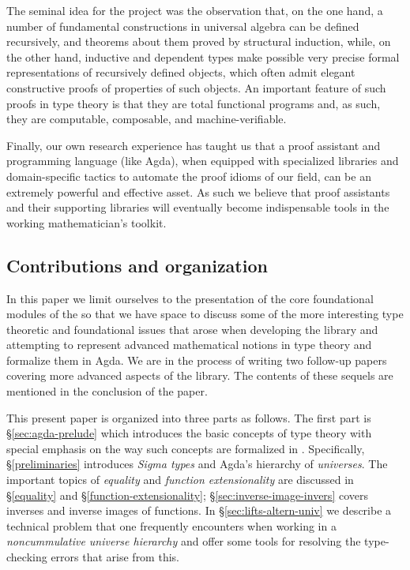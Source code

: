 The seminal idea for the \agdaualib project was the observation that, on the one hand, a number of fundamental constructions in universal algebra can be defined recursively, and theorems about them proved by structural induction, while, on the other hand, inductive and dependent types make possible very precise formal representations of recursively defined objects, which often admit elegant constructive proofs of properties of such objects.  An important feature of such proofs in type theory is that they are total functional programs and, as such, they are computable, composable, and machine-verifiable.

Finally, our own research experience has taught us that a proof assistant and programming language (like Agda), when equipped with specialized libraries and domain-specific tactics to automate the proof idioms of our field, can be an extremely powerful and effective asset. As such we believe that proof assistants and their supporting libraries will eventually become indispensable tools in the working mathematician's toolkit.



\subsection{Contributions and organization}
\label{sec:contributions}

In this paper we limit ourselves to the presentation of the core foundational modules of the \ualib so that we have space to discuss some of the more interesting type theoretic and foundational issues that arose when developing the library and attempting to represent advanced mathematical notions in type theory and formalize them in Agda. We are in the process of writing two follow-up papers covering more advanced aspects of the library. The contents of these sequels are mentioned in the conclusion of the paper.

This present paper is organized into three parts as follows. The first part is \S\ref{sec:agda-prelude} which introduces the basic concepts of type theory with special emphasis on the way such concepts are formalized in \agda. Specifically, \S\ref{preliminaries} introduces \emph{Sigma types} and Agda's hierarchy of \emph{universes}. The important topics of \emph{equality} and \emph{function extensionality} are discussed in \S\ref{equality} and \S\ref{function-extensionality}; \S\ref{sec:inverse-image-invers} covers inverses and inverse images of functions. In \S\ref{sec:lifts-altern-univ} we describe a technical problem that one frequently encounters when working in a \emph{noncummulative universe hierarchy} and offer some tools for resolving the type-checking errors that arise from this.

